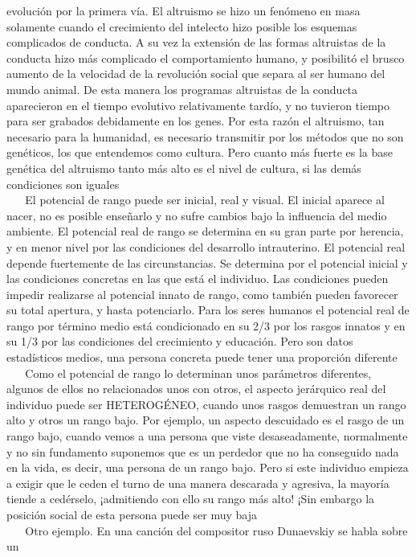 evolución por la primera vía. El altruismo se hizo un fenómeno en masa
solamente cuando el crecimiento del intelecto hizo posible los esquemas
complicados de conducta. A su vez la extensión de las formas altruistas
de la conducta hizo más complicado el comportamiento humano, y
posibilitó el brusco aumento de la velocidad de la revolución social que
separa al ser humano del mundo animal. De esta manera los programas
altruistas de la conducta aparecieron en el tiempo evolutivo
relativamente tardío, y no tuvieron tiempo para ser grabados debidamente
en los genes. Por esta razón el altruismo, tan necesario para la
humanidad, es necesario transmitir por los métodos que no son genéticos,
los que entendemos como cultura. Pero cuanto más fuerte es la base
genética del altruismo tanto más alto es el nivel de cultura, si las
demás condiciones son iguales\\
\hspace*{0.333em} ~ ~ El potencial de rango puede ser inicial, real y
visual. El inicial aparece al nacer, no es posible enseñarlo y no sufre
cambios bajo la influencia del medio ambiente. El potencial real de
rango se determina en su gran parte por herencia, y en menor nivel por
las condiciones del desarrollo intrauterino. El potencial real depende
fuertemente de las circunstancias. Se determina por el potencial inicial
y las condiciones concretas en las que está el individuo. Las
condiciones pueden impedir realizarse al potencial innato de rango, como
también pueden favorecer su total apertura, y hasta potenciarlo. Para
los seres humanos el potencial real de rango por término medio está
condicionado en su 2/3 por los rasgos innatos y en su 1/3 por las
condiciones del crecimiento y educación. Pero son datos estadísticos
medios, una persona concreta puede tener una proporción diferente\\
\hspace*{0.333em} ~ ~ Como el potencial de rango lo determinan unos
parámetros diferentes, algunos de ellos no relacionados unos con otros,
el aspecto jerárquico real del individuo puede ser HETEROGÉNEO, cuando
unos rasgos demuestran un rango alto y otros un rango bajo. Por ejemplo,
un aspecto descuidado es el rasgo de un rango bajo, cuando vemos a una
persona que viste desaseadamente, normalmente y no sin fundamento
suponemos que es un perdedor que no ha conseguido nada en la vida, es
decir, una persona de un rango bajo. Pero si este individuo empieza a
exigir que le ceden el turno de una manera descarada y agresiva, la
mayoría tiende a cedérselo, ¡admitiendo con ello su rango más alto! ¡Sin
embargo la posición social de esta persona puede ser muy baja\\
\hspace*{0.333em} ~ ~ Otro ejemplo. En una canción del compositor ruso
Dunaevskiy se habla sobre un

